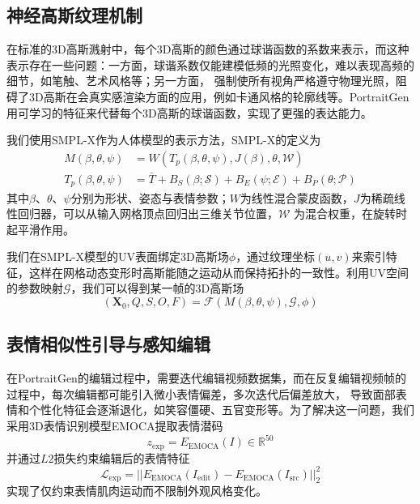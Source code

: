 \subsection{神经高斯纹理机制}

在标准的3D高斯溅射中，每个3D高斯的颜色通过球谐函数的系数来表示，而这种表示存在一些问题：一方面，球谐系数仅能建模低频的光照变化，难以表现高频的细节，如笔触、艺术风格等；另一方面，
强制使所有视角严格遵守物理光照，阻碍了3D高斯在会真实感渲染方面的应用，例如卡通风格的轮廓线等。PortraitGen用可学习的特征来代替每个3D高斯的球谐函数，实现了更强的表达能力。

我们使用SMPL-X作为人体模型的表示方法，SMPL-X的定义为
\begin{align}
    M(\beta,\theta,\psi)&=W(T_p(\beta,\theta,\psi), J(\beta),\theta, \mathcal{W})\\
    T_p(\beta,\theta,\psi)&=\bar{T}+B_S(\beta;\mathcal{S})+B_E(\psi;\mathcal{E})+B_P(\theta;\mathcal{P})
\end{align}
其中$\beta$、$\theta$、$\psi$分别为形状、姿态与表情参数；$W$为线性混合蒙皮函数，$J$为稀疏线性回归器，可以从输入网格顶点回归出三维关节位置，$\mathcal{W}$
为混合权重，在旋转时起平滑作用。

我们在SMPL-X模型的UV表面绑定3D高斯场$\phi$，通过纹理坐标$(u,v)$来索引特征，这样在网格动态变形时高斯能随之运动从而保持拓扑的一致性。利用UV空间的参数映射$\mathcal{G}$，我们可以得到某一帧的3D高斯场
\begin{equation}
    (\symbf{X}_0,Q,S,O,F)=\mathcal{F}(M(\beta,\theta,\psi),\mathcal{G},\phi)
\end{equation}

\subsection{表情相似性引导与感知编辑}

在PortraitGen的编辑过程中，需要迭代编辑视频数据集，而在反复编辑视频帧的过程中，每次编辑都可能引入微小表情偏差，多次迭代后偏差放大，
导致面部表情和个性化特征会逐渐退化，如笑容僵硬、五官变形等。为了解决这一问题，我们采用3D表情识别模型EMOCA提取表情潜码
\begin{equation}
    z_{\text{exp}}=E_{\text{EMOCA}}(I) \in \mathbb{R} ^{50}
\end{equation}
并通过$L2$损失约束编辑后的表情特征
\begin{equation}
    \mathcal{L}_{\text{exp}}=||E_{\text{EMOCA}}(I_{\text{edit}})-E_{\text{EMOCA}}(I_{\text{src}})||_2^2
\end{equation}
实现了仅约束表情肌肉运动而不限制外观风格变化。


